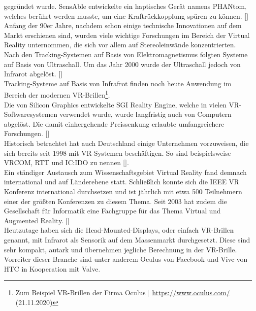 \documentclass[a4paper,12pt,oneside]{article}
\begin{document}
        gegründet wurde. SensAble entwickelte ein haptisches Gerät namens 
        \glqq PHANtom\grqq{}, welches berührt werden musste, um eine
        Kraftrückkopplung spüren zu können. [\cite[20]{Dorner2013}] \\
        Anfang der 90er Jahre, nachdem schon einige technische Innovationen auf dem Markt
        erschienen sind, wurden viele wichtige Forschungen im Bereich der Virtual Reality
        unternommen, die sich vor allem auf Stereoleinwände konzentrierten.
        Nach den Tracking-Systemen auf Basis von Elektromagnetismus folgten Systeme auf
        Basis von Ultraschall. Um das Jahr 2000 wurde der Ultraschall jedoch von Infrarot
        abgelöst. [\cite[20-21]{Dorner2013}] \\ 
        Tracking-Systeme auf Basis von Infrafrot finden noch heute Anwendung im
        Bereich der modernen VR-Brillen\footnote{Zum Beispiel VR-Brillen der Firma Oculus | \url{https://www.oculus.com/} (21.11.2020)}. \\
        Die von Silicon Graphics entwickelte SGI Reality Engine, welche in vielen
        VR-Softwaresystemen verwendet wurde, wurde langfristig auch von Computern
        abgelöst. Die damit einhergehende Preissenkung
        erlaubte umfangreichere Forschungen. [\cite[20-21]{Dorner2013}] \\
        Historisch betrachtet hat auch Deutschland einige Unternehmen vorzuweisen, die sich
        bereits seit 1998 mit VR-Systemen beschäftigen. So sind beispielsweise VRCOM, 
        RTT und IC:IDO zu nennen [\cite[20-21]{Dorner2013}]. \\
        Ein ständiger Austausch zum Wissenschaftsgebiet Virtual Reality fand demnach international
        und auf Länderebene statt. Schließlich konnte sich die IEEE VR Konferenz
        international durchsetzen und ist jährlich mit etwa 500 Teilnehmern einer der
        größten Konferenzen zu diesem Thema.
        Seit 2003 hat zudem die Gesellschaft für Informatik eine Fachgruppe für das Thema
        Virtual und Augmented Reality. [\cite[19-21]{Dorner2013}] \\
        Heutzutage haben sich die Head-Mounted-Displays, oder einfach VR-Brillen genannt,
        mit Infrarot als Sensorik auf dem Massenmarkt durchgesetzt. Diese sind sehr kompakt,
        autark und
        übernehmen jegliche Berechnung in der VR-Brille. Vorreiter dieser Branche sind unter
        anderem Oculus von Facebook und Vive von HTC in Kooperation mit Valve.
\end{document}
